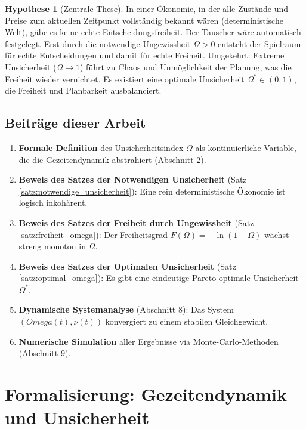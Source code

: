 \documentclass[a4paper, 12pt, twoside, openright]{report}
\theoremstyle{definition}
\theoremstyle{definition}
\newtheorem{hypothese}{Hypothese}[chapter]
\begin{document}
\begin{hypothese}[Zentrale These]
    In einer Ökonomie, in der alle Zustände und Preise zum aktuellen Zeitpunkt vollständig bekannt wären (deterministische Welt), gäbe es keine echte Entscheidungsfreiheit. Der Tauscher wäre automatisch festgelegt. Erst durch die notwendige Ungewissheit $\Omega > 0$ entsteht der Spielraum für echte Entscheidungen und damit für echte Freiheit. Umgekehrt: Extreme Unsicherheit ($\Omega \to 1$) führt zu Chaos und Unmöglichkeit der Planung, was die Freiheit wieder vernichtet. Es existiert eine optimale Unsicherheit $\Omega^* \in (0,1)$, die Freiheit und Planbarkeit ausbalanciert.
\end{hypothese}

\subsection{Beiträge dieser Arbeit}

\begin{enumerate}
    \item \textbf{Formale Definition} des Unsicherheitsindex $\Omega$ als kontinuierliche Variable, die die Gezeitendynamik abstrahiert (Abschnitt 2).
    
    \item \textbf{Beweis des Satzes der Notwendigen Unsicherheit} (Satz \ref{satz:notwendige_unsicherheit}): Eine rein deterministische Ökonomie ist logisch inkohärent.
    
    \item \textbf{Beweis des Satzes der Freiheit durch Ungewissheit} (Satz \ref{satz:freiheit_omega}): Der Freiheitsgrad $F(\Omega) = -\ln(1-\Omega)$ wächst streng monoton in $\Omega$.
    
    \item \textbf{Beweis des Satzes der Optimalen Unsicherheit} (Satz \ref{satz:optimal_omega}): Es gibt eine eindeutige Pareto-optimale Unsicherheit $\Omega^*$.
    
    \item \textbf{Dynamische Systemanalyse} (Abschnitt 8): Das System $(Omega(t), \nu(t))$ konvergiert zu einem stabilen Gleichgewicht.
    
    \item \textbf{Numerische Simulation} aller Ergebnisse via Monte-Carlo-Methoden (Abschnitt 9).
\end{enumerate}

\section{Formalisierung: Gezeitendynamik und Unsicherheit}
\end{document}
